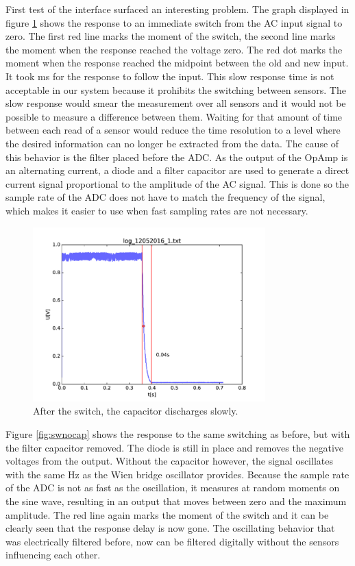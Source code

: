First test of the interface surfaced an interesting problem. The graph displayed in figure \ref{fig:swcap} shows the response to an immediate switch from the AC input signal to zero. The first red line marks the moment of the switch, the second line marks the moment when the response reached the voltage zero. The red dot marks the moment when the response reached the midpoint between the old and new input. It took \unit[40]{ms} for the response to follow the input. This slow response time is not acceptable in our system because it prohibits the switching between sensors. The slow response would smear the measurement over all sensors and it would not be possible to measure a difference between them. Waiting for that amount of time between each read of a sensor would reduce the time resolution to a level where the desired information can no longer be extracted from the data. The cause of this behavior is the filter placed before the ADC. As the output of the OpAmp is an alternating current, a diode and a filter capacitor are used to generate a direct current signal proportional to the amplitude of the AC signal. This is done so the sample rate of the ADC does not have to match the frequency of the signal, which makes it easier to use when fast sampling rates are not necessary.\\

\begin{figure}
	\begin{center}
		\includegraphics[width=0.8\textwidth]{images/switch_cap.pdf} 
		\caption{After the switch, the capacitor discharges slowly.}
		\label{fig:swcap}
	\end{center}
\end{figure}

Figure \ref{fig:swnocap} shows the response to the same switching as before, but with the filter capacitor removed. The diode is still in place and removes the negative voltages from the output. Without the capacitor however, the signal oscillates with the same \unit[1666]{Hz} as the Wien bridge oscillator provides. Because the sample rate of the ADC is not as fast as the oscillation, it measures at random moments on the sine wave, resulting in an output that moves between zero and the maximum amplitude. The red line again marks the moment of the switch and it can be clearly seen that the response delay is now gone. The oscillating behavior that was electrically filtered before, now can be filtered digitally without the sensors influencing each other.

